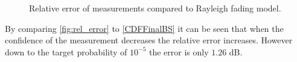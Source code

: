 \begin{figure}[H]
\centering

\caption{Relative error of measurements compared to Rayleigh fading model.}
\label{fig:rel_error}
\end{figure}

By comparing \autoref{fig:rel_error} to \autoref{CDFFinalBS} it can be seen that when the confidence of the measurement decreases the relative error increases. However down to the target probability of $10^{-5}$ the error is only $1.26$ dB. 









